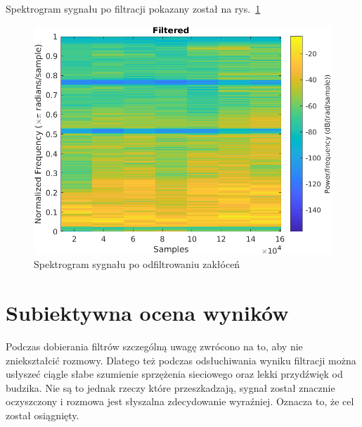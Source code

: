 Spektrogram sygnału po filtracji pokazany został na rys.~\ref{filtered}

\begin{figure}
\centering
\includegraphics{dane/filtered.png} %
\caption{Spektrogram sygnału po odfiltrowaniu zakłóceń}
\label{filtered}
\end{figure}

\section{Subiektywna ocena wyników}
Podczas dobierania filtrów szczególną uwagę zwrócono na to, aby nie zniekształcić rozmowy.
Dlatego też podczas odsłuchiwania wyniku filtracji można usłyszeć ciągle słabe szumienie sprzężenia sieciowego oraz lekki przydźwięk od budzika.
Nie są to jednak rzeczy które przeszkadzają, sygnał został znacznie oczyszczony i rozmowa jest słyszalna zdecydowanie wyraźniej.
Oznacza to, że cel został osiągnięty.
